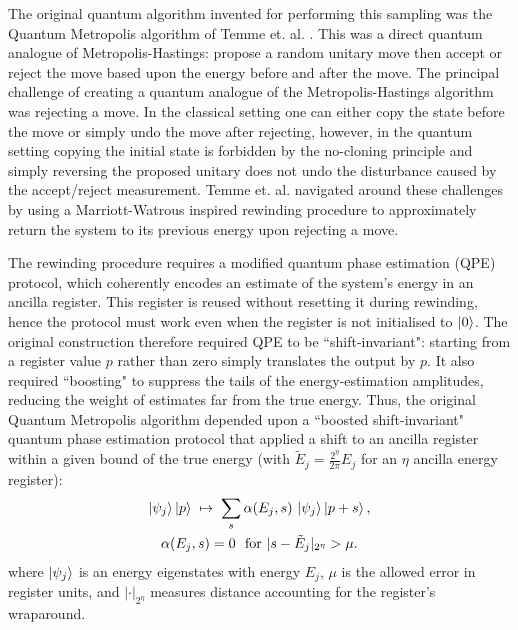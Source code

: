 \documentclass[aps,floatfix,10pt,amssymb,amsfont,amsmath,superscriptaddress,float,nofootinbib,longbibliography,nobalancelastpage,twocolumn]{revtex4-2}
\begin{document}
The original quantum algorithm invented for performing this sampling was the Quantum Metropolis algorithm of Temme et. al. \cite{Temme_2011}. This was a direct quantum analogue of Metropolis-Hastings: propose a random unitary move then accept or reject the move based upon the energy before and after the move. The principal challenge of creating a quantum analogue of the Metropolis-Hastings algorithm was rejecting a move. In the classical setting one can either copy the state before the move or simply undo the move after rejecting, however, in the quantum setting copying the initial state is forbidden by the no-cloning principle and simply reversing the proposed unitary does not undo the disturbance caused by the accept/reject measurement. Temme et. al. \cite{Temme_2011} navigated around these challenges by using a Marriott-Watrous \cite{MarriottWatrous} inspired rewinding procedure to approximately return the system to its previous energy upon rejecting a move.

The rewinding procedure requires a modified quantum phase estimation (QPE) protocol, which coherently encodes an estimate of the system’s energy in an ancilla register. This register is reused without resetting it during rewinding, hence the protocol must work even when the register is not initialised to $\ket{0}$. The original construction therefore required QPE to be ``shift-invariant": starting from a register value $p$ rather than zero simply translates the output by $p$. It also required ``boosting" to suppress the tails of the energy-estimation amplitudes, reducing the weight of estimates far from the true energy. Thus, the original Quantum Metropolis algorithm depended upon a  ``boosted shift-invariant" quantum phase estimation protocol that applied a shift to an ancilla register within a given bound of the true energy (with $\tilde E_j = \frac{2^{\eta}}{2\pi}E_j$ for an $\eta$ ancilla energy register):
\begin{multline}
  \ket{\psi_j}\ket{p} \;\mapsto\; \sum_{s} \alpha(E_j,s)\,\ket{\psi_j}\ket{p+s},
  \\\alpha(E_j,s) = 0 \ \text{ for } |s-\tilde E_j|_{2^{\eta}} > \mu .
  \label{eq:Boostedshiftinvariantqpe}
\end{multline}
where $\ket{\psi_j}$ is an energy eigenstates with energy $E_j$, $\mu$ is the allowed error in register units, and $|\cdot|_{2^\eta}$ measures distance accounting for the register’s wraparound.
\end{document}
